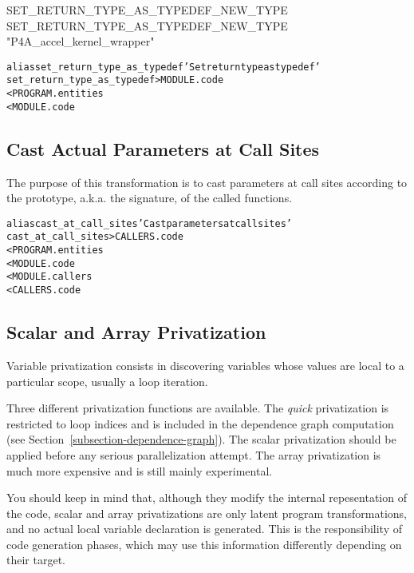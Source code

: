 \documentclass[a4paper]{report}
\newenvironment{PipsMake}{\begin{alltt}}{\end{alltt}}
\newenvironment{PipsPass}[1]{\label{pass:#1}}{}
\begin{document}
\begin{PipsProp}{SET_RETURN_TYPE_AS_TYPEDEF_NEW_TYPE}
SET_RETURN_TYPE_AS_TYPEDEF_NEW_TYPE "P4A_accel_kernel_wrapper"
\end{PipsProp}

\begin{PipsMake}
alias set_return_type_as_typedef 'Set return type as typedef'
set_return_type_as_typedef > MODULE.code
        < PROGRAM.entities
        < MODULE.code
\end{PipsMake}


\subsection{Cast Actual Parameters at Call Sites}

\begin{PipsPass}{cast_at_call_sites}
The purpose of this transformation is to cast parameters at call sites
according to the prototype, a.k.a. the signature, of the called functions.
\end{PipsPass}


\begin{PipsMake}
alias cast_at_call_sites 'Cast parameters at call sites'
cast_at_call_sites > CALLERS.code
        < PROGRAM.entities
        < MODULE.code
        < MODULE.callers
        < CALLERS.code
\end{PipsMake}



\subsection{Scalar and Array Privatization}
\label{sec:scalar-and-array-privatization}

Variable privatization consists in discovering variables whose values are
local to a particular scope, usually a loop iteration.

Three different privatization functions are available. The {\em quick}
privatization is restricted to loop indices and is included in the
dependence graph computation (see
Section~\ref{subsection-dependence-graph}). The scalar privatization should
be applied before any serious parallelization attempt. The array
privatization is much more expensive and is still mainly experimental.

You should keep in mind that, although they modify the internal
repesentation of the code, scalar and array privatizations are only
latent program transformations, and no actual local variable
declaration is generated. This is the responsibility of code
generation phases, which may use this information differently
depending on their target.
\end{document}
